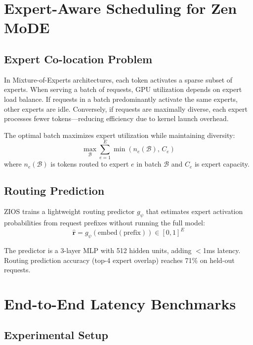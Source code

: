 \documentclass[11pt,a4paper]{article}
\begin{document}
\section{Expert-Aware Scheduling for Zen MoDE}

\subsection{Expert Co-location Problem}

In Mixture-of-Experts architectures, each token activates a sparse subset of experts. When serving a batch of requests, GPU utilization depends on expert load balance. If requests in a batch predominantly activate the same experts, other experts are idle. Conversely, if requests are maximally diverse, each expert processes fewer tokens—reducing efficiency due to kernel launch overhead.

The optimal batch maximizes expert utilization while maintaining diversity:
\begin{equation}
\max_{\mathcal{B}} \sum_{e=1}^{E} \min\!\left(n_e(\mathcal{B}),\, C_e\right)
\end{equation}
where $n_e(\mathcal{B})$ is tokens routed to expert $e$ in batch $\mathcal{B}$ and $C_e$ is expert capacity.

\subsection{Routing Prediction}

ZIOS trains a lightweight routing predictor $g_\psi$ that estimates expert activation probabilities from request prefixes without running the full model:
\begin{equation}
\hat{\mathbf{r}} = g_\psi(\text{embed}(\text{prefix})) \in [0,1]^E
\end{equation}

The predictor is a 3-layer MLP with 512 hidden units, adding $<$1ms latency. Routing prediction accuracy (top-4 expert overlap) reaches 71\% on held-out requests.

\section{End-to-End Latency Benchmarks}

\subsection{Experimental Setup}
\end{document}
